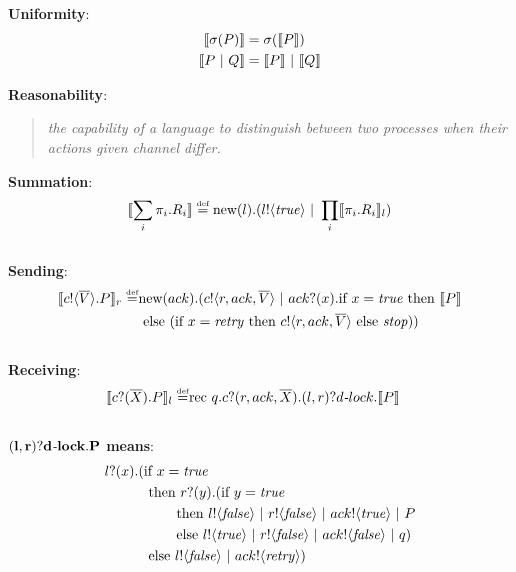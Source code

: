 \documentclass[12pt,twoside]{reedthesis}
\begin{document}
		\textbf{Uniformity}:
		\begin{align*}
			\encode{\sigma(P)} &= \sigma(\encode{P})\\
			\encode{P\comp Q} &= \encode{P} \comp \encode{Q}
		\end{align*}
		
		\textbf{Reasonability}:
		\begin{quote}
			\emph{the capability of a language to distinguish between two processes when their actions  given channel differ.}
		\end{quote}
		
		\newpage
	  	\null\vfil
	
		\centering \textbf{Summation}:
		\[
			\encode{\displaystyle\sum_{i} \pi_i.R_i} \defequals \new{l}(\send{l}{\ptrue} \comp \displaystyle\prod_{i}\encode{\pi_i.R_i}_l)
		\]\\[20pt]
		
		\centering \textbf{Sending}:
		\begin{equation*}\begin{split}
			\encode{\ssend{c}{\tuple{V}}P}_r \defequals & \new{ack}(\send{c}{r,ack,\tuple{V}} \comp \receive{ack}{x} \pif{x=\ptrue} \pthen \encode{P} \\
			&\pelse (\pif{x=\pretry} \pthen \send{c}{r,ack,\tuple{V}} \pelse \pstop))
		\end{split}\end{equation*}\\[20pt]
		
		\centering \textbf{Receiving}:
		\begin{equation*}\begin{split}
			\encode{\receive{c}{\tuple{X}}P}_l \defequals & \rec{q}\receive{c}{r,ack,\tuple{X}} (l,r)?d\mbox{\emph{-}}lock.\encode{P}
		\end{split}\end{equation*}\\[20pt]
		
		\centering $\mathbf{(l,r)?d\mbox{\emph{-}}lock.P}$ \textbf{means}:
		\begin{equation*}\begin{split}
			\receive{l}{x}(&\pif{x=\ptrue}\\
			&\pthen \receive{r}{y} (\pif {y=\ptrue}\\
			&\ \ \ \ \ \ \pthen \send{l}{\pfalse} \comp \send{r}{\pfalse} \comp \send{ack}{\ptrue} \comp P\\
			&\ \ \ \ \ \ \pelse \send{l}{\ptrue} \comp \send{r}{\pfalse} \comp \send{ack}{\pfalse} \comp q)\\
			&\pelse\send{l}{\pfalse} \comp \send{ack}{\pretry})\\
		\end{split}\end{equation*}
		
\end{document}
